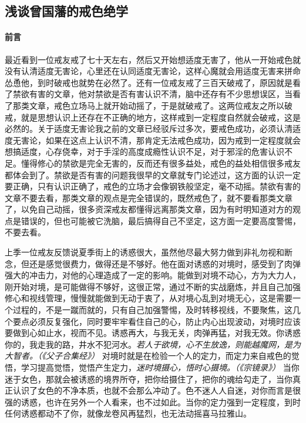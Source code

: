 \subsection{浅谈曾国藩的戒色绝学}

\paragraph*{前言}

最近看到一位戒友戒了七十天左右，然后又开始想适度无害了，他从一开始戒色就没有认清适度无害论，心里还在认同适度无害论，这样心魔就会用适度无害来拼命怂恿他，到时破戒也就势在必然了。还有一位戒友戒了三百天破戒了，原因就是看了禁欲有害的文章，他对禁欲是否有害认识不清，脑中还存有不少思想误区，当看了那类文章，戒色立场马上就开始动摇了，于是就破戒了。这两位戒友之所以破戒，就是思想认识上还存在不正确的地方，这样戒到一定程度自然就会破戒，这是必然的。关于适度无害论我之前的文章已经驳斥过多次，要戒色成功，必须认清适度无害论，如果在这点上认识不清，那肯定无法戒色成功，因为戒到一定程度就会想搞适度，心存侥幸，对于手淫的高度成瘾性认识不足，对于邪淫的危害认识不足。懂得修心的禁欲是完全无害的，反而还有很多益处，戒色的益处相信很多戒友都体会到了。禁欲是否有害的问题我很早的文章就专门论述过，这方面的认识一定要正确，只有认识正确了，戒色的立场才会像钢铁般坚定，毫不动摇。禁欲有害的文章不要去看，那类文章的观点是完全错误的，既然戒色了，就不要看那类文章了，以免自己动摇，很多资深戒友都懂得远离那类文章，因为有时明知道对方的观点是错误的，但也可能被它洗脑，最后搞得自己不坚定，这方面一定要高度警惕，不要去看。

上季一位戒友反馈说夏季街上的诱惑很大，虽然他尽最大努力做到非礼勿视和断念，但还是感觉很费力，做得还是不够好。他在面对诱惑的对境时，感受到了肉弹强大的冲击力，对他的心理造成了一定的影响。能做到对境不动心，方为大力人，刚开始对境，是可能做得不够好，这很正常，通过不断的实战磨炼，并且自己加强修心和视线管理，慢慢就能做到无动于衷了，从对境心乱到对境无心，这是需要一个过程的，不是一蹴而就的，只有自己加强警惕，及时转移视线，不要聚焦，这几个要点必须反复强化，同时要牢牢看住自己的心，防止内心出现波动，对境时应该要做到心如止水，视而不见。诱惑再大，与我无关，肉弹再猛，对我无效。你诱惑你的，我走我的路，井水不犯河水。\textit{若人于欲境，心不生放逸，则能越魔网，是为大智者。（《父子合集经》）} 对境时就是在检验一个人的定力，而定力来自戒色的觉悟，学习提高觉悟，觉悟产生定力，\textit{迷时境摄心，悟时心摄境。（《宗镜录》）} 当你迷于女色，那就会被诱惑的境界所夺，把你给摄住了，把你的魂给勾走了，当你真正认识了女色的不净本质，也就不会那么冲动了。色不迷人人自迷，对你而言是很强的诱惑，也许在另外一个人看来，也不过如此。当你的定力强到一定程度，到时任何诱惑都动不了你，就像龙卷风再猛烈，也无法动摇喜马拉雅山。

